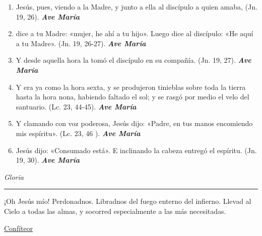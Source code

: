 \documentclass[a4paper,11pt, oneside]{report}
\begin{document}
{{\begin{enumerate}
        \item Jesús, pues, viendo a la Madre, y junto a ella al discípulo a quien amaba, (Jn. 19, 26). \textbf{\textit{Ave María}}

        \item dice a tu Madre: «mujer, he ahí a tu hijo». Luego dice al discípulo: «He aquí a tu Madre». (Jn. 19, 26-27). \textbf{\textit{Ave María}}

        \item Y desde aquella hora la tomó el discípulo en su compañía. (Jn. 19, 27). \textbf{\textit{Ave María}}

        \item Y era ya como la hora sexta, y se produjeron tinieblas sobre toda la tierra hasta la hora nona, 
        habiendo faltado el sol; y se rasgó por medio el velo del santuario. (Lc. 23, 44-45). \textbf{\textit{Ave María}}

        \item Y clamando con voz poderosa, Jesús dijo: «Padre, en tus manos encomiendo mis espíritu». (Lc. 23, 46 ). \textbf{\textit{Ave María}}

        \item Jesús dijo: «Consumado está». E inclinando la cabeza entregó el espíritu. (Jn. 19, 30). \textbf{\textit{Ave María}}

      \end{enumerate}
      
      \indent\textit{Gloria} \par      

      \begin{center}\rule{1\linewidth}{\linethickness}\end{center}      
      
      \medskip
      \hypertarget{finalMuerte}{¡Oh Jesús mío! Perdonadnos. Libradnos del fuego enterno del infierno. Llevad al Cielo a todas las almas, y socorred especialmente a las más 
      necesitadas.}
    }

  \par\bigskip
  \hyperlink{sec:confiteor}{Confíteor}
}
        
\end{document}
